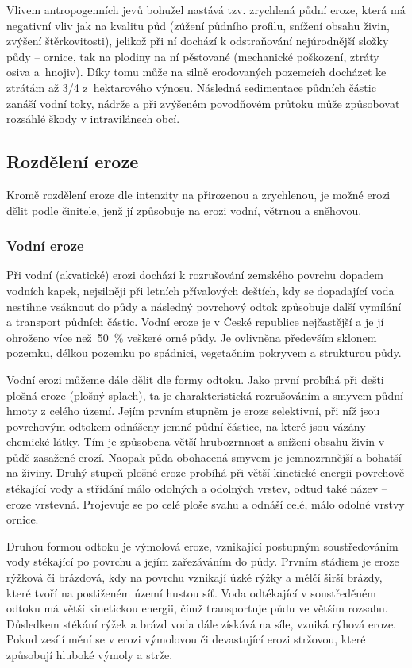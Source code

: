 Vlivem antropogenních jevů bohužel nastává tzv. zrychlená půdní eroze,
která má negativní vliv jak na kvalitu půd (zúžení půdního profilu,
snížení obsahu živin, zvýšení štěrkovitosti), jelikož při ní dochází k
odstraňování nejúrodnější složky půdy – ornice, tak na plodiny na ní
pěstované (mechanické poškození, ztráty osiva a~hnojiv). Díky tomu
může na silně erodovaných pozemcích docházet ke ztrátám až 3/4
z~hektarového výnosu. Následná sedimentace půdních částic zanáší vodní
toky, nádrže a při zvýšeném povodňovém průtoku může způsobovat
rozsáhlé škody v intravilánech obcí.\cite{Novotny2014}
\subsection{Rozdělení eroze}
Kromě rozdělení eroze dle intenzity na přirozenou a zrychlenou, je
možné erozi dělit podle činitele, jenž jí způsobuje na erozi vodní,
větrnou a sněhovou.\cite{Holy1994}
\subsubsection{Vodní eroze}
Při vodní (akvatické) erozi dochází k rozrušování zemského povrchu
dopadem vodních kapek, nejsilněji při letních přívalových deštích, kdy
se dopadající voda nestihne vsáknout do půdy a následný povrchový
odtok způsobuje další vymílání a transport půdních částic. Vodní eroze
je v České republice nejčastější a je jí ohroženo více než~50~\%
veškeré orné půdy. Je ovlivněna především sklonem pozemku, délkou
pozemku po spádnici, vegetačním pokryvem a strukturou půdy.

Vodní erozi můžeme dále dělit dle formy odtoku. Jako první probíhá při
dešti plošná eroze (plošný splach), ta je charakteristická
rozrušováním a smyvem půdní hmoty z celého území. Jejím prvním stupněm
je eroze selektivní, při níž jsou povrchovým odtokem odnášeny jemné
půdní částice, na které jsou vázány chemické látky. Tím je způsobena
větší hrubozrnnost a snížení obsahu živin v půdě zasažené
erozí. Naopak půda obohacená smyvem je jemnozrnnější a bohatší na
živiny. Druhý stupeň plošné eroze probíhá při větší kinetické energii
povrchově stékající vody a střídání málo odolných a odolných vrstev,
odtud také název – eroze vrstevná. Projevuje se po celé ploše svahu a
odnáší celé, málo odolné vrstvy ornice.

Druhou formou odtoku je výmolová eroze, vznikající postupným
soustřeďováním vody stékající po povrchu a jejím zařezáváním do
půdy. Prvním stádiem je eroze rýžková či brázdová, kdy na povrchu
vznikají úzké rýžky a mělčí širší brázdy, které tvoří na postiženém
území hustou síť. Voda odtékající v soustředěném odtoku má větší
kinetickou energii, čímž transportuje půdu ve větším
rozsahu. Důsledkem stékání rýžek a brázd voda dále získává na síle,
vzniká rýhová eroze. Pokud zesílí mění se v erozi výmolovou či
devastující erozi stržovou, které způsobují hluboké výmoly a
strže.\cite{Novotny2014}

